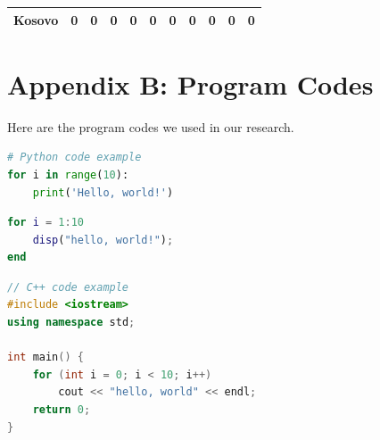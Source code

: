 \documentclass[12pt]{article}  %
\begin{document}
\begin{subappendices}
\begin{longtable}{|l|c|c|c|c|c|c|c|c|c|c|}
	\hline
	Kosovo                                                         & 0                                                                      & 0                                                                      & 0                                                                      & 0                                                                      & 0                                                                      & 0                                                                      & 0                         & 0                           & 0                           & 0                           \\
	\hline
\end{longtable}



\section{Appendix B: Program Codes}
Here are the program codes we used in our research.


\begin{lstlisting}[language=Python, name={test.py}]
# Python code example
for i in range(10):
    print('Hello, world!')
\end{lstlisting}

\begin{lstlisting}[language=MATLAB, name={test.m}]
% MATLAB code example
for i = 1:10
    disp("hello, world!");
end
\end{lstlisting}



\begin{lstlisting}[language=C++, name={test.cpp}]
// C++ code example
#include <iostream>
using namespace std;

int main() {
    for (int i = 0; i < 10; i++)
        cout << "hello, world" << endl;
    return 0;
}
\end{lstlisting}

\end{subappendices}  %
\end{document}
